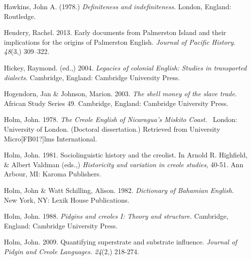 \begin{styleStandard}
Hawkins, John A. (1978.) \textit{Definiteness and indefiniteness. }London, England: Routledge. 
\end{styleStandard}


\begin{styleStandard}
Hendery, Rachel. 2013. Early documents from Palmerston Island and their implications for the origins of Palmerston English. \textit{Journal of Pacific History}. \textit{48}(3,) 309–322. 
\end{styleStandard}


\begin{styleStandard}
Hickey, Raymond. (ed.,) 2004. \textit{Legacies of colonial English: Studies in transported dialects}. Cambridge, England: Cambridge University Press.
\end{styleStandard}


\begin{styleStandard}
Hogendorn, Jan \& Johnson, Marion. 2003. \textit{The shell money of the slave trade}. African Study Series 49. Cambridge, England: Cambridge University Press. 
\end{styleStandard}


\begin{styleStandard}
Holm, John. 1978. \textit{The Creole English of Nicaragua’s Miskito Coast. }\ London: University of London. (Doctoral dissertation.) Retrieved from University Micro[FB01?]lms International.
\end{styleStandard}


\begin{styleStandard}
Holm, John. 1981. Sociolinguistic history and the creolist. In Arnold R. Highfield, \& Albert Valdman (eds.,) \textit{Historicity and variation in creole studies}, 40-51\textit{.} Ann Arbour, MI: Karoma Publishers.
\end{styleStandard}


\begin{styleStandard}
Holm, John \& Watt Schilling, Alison. 1982. \textit{Dictionary of Bahamian English}. New York, NY: Lexik House Publications.
\end{styleStandard}


\begin{styleStandard}
Holm, John. 1988. \textit{Pidgins and creoles I: Theory and structure. }Cambridge, England: Cambridge University Press.
\end{styleStandard}


\begin{styleStandard}
Holm, John. 2009. Quantifying superstrate and substrate influence. \textit{Journal of Pidgin and Creole Languages. 24}(2,) 218-274.
\end{styleStandard}


